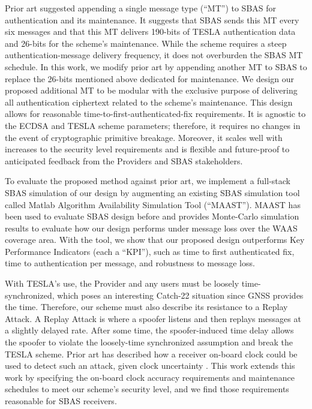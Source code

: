 \documentclass[letterpaper,times]{IONconf/IONconf}
\begin{document}
Prior art suggested appending a single message type (``MT'') to SBAS for authentication and its maintenance\cite{Neish_Dissertation}.
It suggests that SBAS sends this MT every six messages and that this MT delivers 190-bits of TESLA authentication data and 26-bits for the scheme's maintenance.
While the scheme requires a steep authentication-message delivery frequency, it does not overburden the SBAS MT schedule.
In this work, we modify prior art by appending another MT to SBAS to replace the 26-bits mentioned above dedicated for maintenance.
We design our proposed additional MT to be modular with the exclusive purpose of delivering all authentication ciphertext related to the scheme's maintenance.
This design allows for reasonable time-to-first-authenticated-fix requirements.
It is agnostic to the ECDSA and TESLA scheme parameters; therefore, it requires no changes in the event of cryptographic primitive breakage.
Moreover, it scales well with increases to the security level requirements and is flexible and future-proof to anticipated feedback from the Providers and SBAS stakeholders.

To evaluate the proposed method against prior art, we implement a full-stack SBAS simulation of our design by augmenting an existing SBAS simulation tool called Matlab Algorithm Availability Simulation Tool (``MAAST'')\cite{MAAST}.
MAAST has been used to evaluate SBAS design before and provides Monte-Carlo simulation results to evaluate how our design performs under message loss over the WAAS coverage area.
With the tool, we show that our proposed design outperforms Key Performance Indicators (each a ``KPI''), such as time to first authenticated fix, time to authentication per message, and robustness to message loss.

With TESLA's use, the Provider and any users must be loosely time-synchronized, which poses an interesting Catch-22 situation since GNSS provides the time.
Therefore, our scheme must also describe its resistance to a Replay Attack.
A Replay Attack is where a spoofer listens and then replays messages at a slightly delayed rate.
After some time, the spoofer-induced time delay allows the spoofer to violate the loosely-time synchronized assumption and break the TESLA scheme.
Prior art has described how a receiver on-board clock could be used to detect such an attack, given clock uncertainty \cite{time_sync_paper}.
This work extends this work by specifying the on-board clock accuracy requirements and maintenance schedules to meet our scheme's security level, and we find those requirements reasonable for SBAS receivers.
\end{document}
